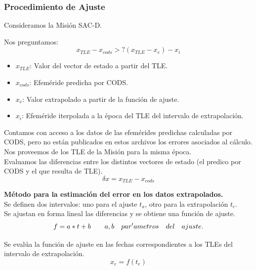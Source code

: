 \subsubsection{Procedimiento de Ajuste}
Consideramos la Misi\'on SAC-D.

Nos preguntamos:\\
\begin{equation}
 x_{TLE}-x_{cods} > ? (x_{TLE}-x_{e})-x_{i}
\end{equation}
\begin{itemize}
 \item $x_{TLE}$: Valor del vector de estado a partir del TLE.\\
 \item $x_{cods}$: Efem\'eride predicha por CODS.\\
 \item $x_{e}$: Valor extrapolado a partir de la funci\'on de ajuste.\\
 \item $x_{i}$: Efem\'eride iterpolada a la \'epoca del TLE del intervalo de extrapolaci\'on.\\
\end{itemize}


Contamos con acceso a los datos de las efem\'erides predichas calculadas por CODS, pero no están publicados en estos archivos los errores asociados al c\'alculo.\\
Nos proveemos de los TLE de la Misi\'on para la misma \'epoca.\\
Evaluamos las diferencias entre los distintos vectores de estado (el predico por CODS y el que resulta de TLE).\\

\begin{equation}
 \delta x = x_{TLE}-x_{cods}
\end{equation}


{\bf{M\'etodo para la estimaci\'on del error en los datos extrapolados.}}\\
Se definen dos intervalos: uno para el ajuste $t_{a}$, otro para la extrapolaci\'on $t_{e}$.\\
Se ajustan en forma lineal las diferencias y se obtiene una funci\'on de ajuste.\\
\begin{equation}
 f=a*t+b \qquad a,b\quad par\\'ametros\quad del \quad ajuste.
\end{equation}

Se eval\'ua la funci\'on de ajuste en las fechas correspondientes a los TLEs del intervalo de extrapolaci\'on.\\
\begin{equation}
 x_{e}=f(t_{e})
\end{equation}

